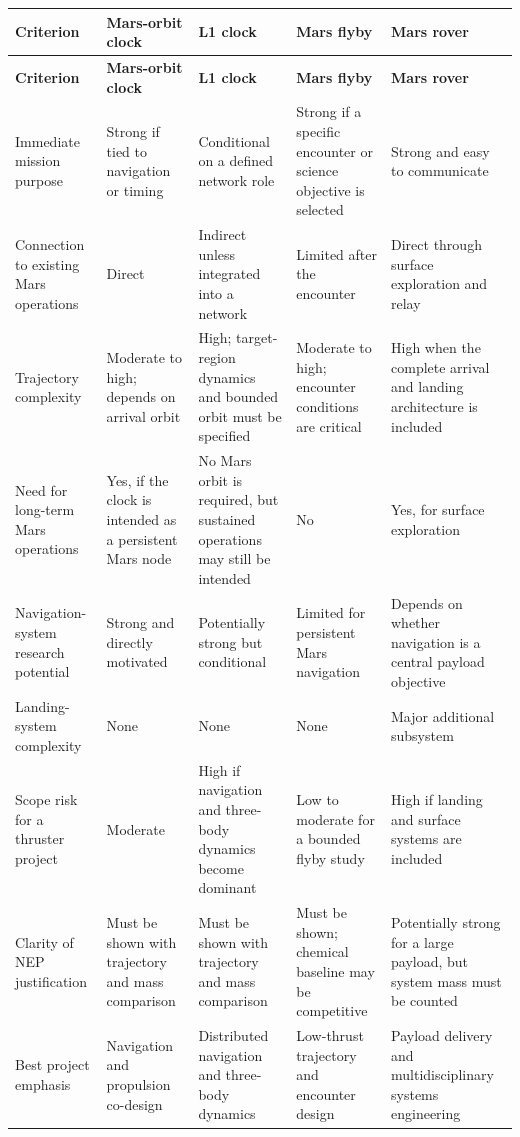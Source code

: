 \begin{longtable}{
		p{}
		p{}
		p{}
		p{}
		p{}
	}
	\toprule
	\textbf{Criterion}
	 & \textbf{Mars-orbit clock}
	 & \textbf{L1 clock}
	 & \textbf{Mars flyby}
	 & \textbf{Mars rover}
	\\
	\midrule
	\endfirsthead

	\toprule
	\textbf{Criterion}
	 & \textbf{Mars-orbit clock}
	 & \textbf{L1 clock}
	 & \textbf{Mars flyby}
	 & \textbf{Mars rover}
	\\
	\midrule
	\endhead

	Immediate mission purpose
	 & Strong if tied to navigation or timing
	 & Conditional on a defined network role
	 & Strong if a specific encounter or science objective is selected
	 & Strong and easy to communicate
	\\

	Connection to existing Mars operations
	 & Direct
	 & Indirect unless integrated into a network
	 & Limited after the encounter
	 & Direct through surface exploration and relay
	\\

	Trajectory complexity
	 & Moderate to high; depends on arrival orbit
	 & High; target-region dynamics and bounded orbit must be specified
	 & Moderate to high; encounter conditions are critical
	 & High when the complete arrival and landing architecture is included
	\\

	Need for long-term Mars operations
	 & Yes, if the clock is intended as a persistent Mars node
	 & No Mars orbit is required, but sustained operations may still be intended
	 & No
	 & Yes, for surface exploration
	\\

	Navigation-system research potential
	 & Strong and directly motivated
	 & Potentially strong but conditional
	 & Limited for persistent Mars navigation
	 & Depends on whether navigation is a central payload objective
	\\

	Landing-system complexity
	 & None
	 & None
	 & None
	 & Major additional subsystem
	\\

	Scope risk for a thruster project
	 & Moderate
	 & High if navigation and three-body dynamics become dominant
	 & Low to moderate for a bounded flyby study
	 & High if landing and surface systems are included
	\\

	Clarity of NEP justification
	 & Must be shown with trajectory and mass comparison
	 & Must be shown with trajectory and mass comparison
	 & Must be shown; chemical baseline may be competitive
	 & Potentially strong for a large payload, but system mass must be counted
	\\

	Best project emphasis
	 & Navigation and propulsion co-design
	 & Distributed navigation and three-body dynamics
	 & Low-thrust trajectory and encounter design
	 & Payload delivery and multidisciplinary systems engineering
	\\
	\bottomrule
\end{longtable}

